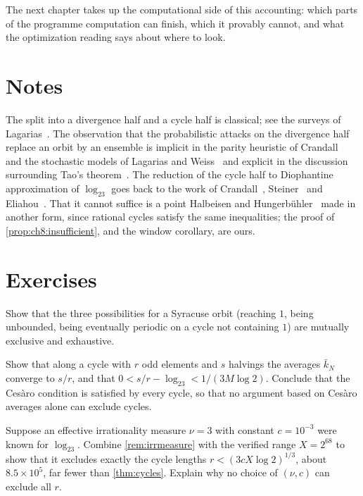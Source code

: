 The next chapter takes up the computational side of this accounting: which
parts of the programme computation can finish, which it provably cannot, and
what the optimization reading says about where to look.

\section*{Notes}

The split into a divergence half and a cycle half is classical; see the surveys
of Lagarias~\cite{lagarias1985,lagarias2010overview}. The observation that the probabilistic attacks
on the divergence half replace an orbit by an ensemble is implicit in the
parity heuristic of Crandall~\cite{crandall1978} and the stochastic models of Lagarias and Weiss~\cite{lagarias1992} and explicit in the
discussion surrounding Tao's theorem~\cite{tao2022}. The reduction of the cycle
half to Diophantine approximation of $\log_23$ goes back to the work of
Crandall~\cite{crandall1978}, Steiner~\cite{steiner1977} and Eliahou~\cite{eliahou1993}. That it
cannot suffice is a point Halbeisen and Hungerb\"uhler~\cite[\S5]{halbeisen1997}
made in another form, since rational cycles satisfy the same inequalities; the
proof of \cref{prop:ch8:insufficient}, and the window corollary, are ours.

\section*{Exercises}

\begin{exercise}
Show that the three possibilities for a Syracuse orbit (reaching $1$, being
unbounded, being eventually periodic on a cycle not containing $1$) are
mutually exclusive and exhaustive.
\end{exercise}

\begin{exercise}
Show that along a cycle with $r$ odd elements and $s$ halvings the averages
$\bar k_N$ converge to $s/r$, and that $0<s/r-\log_23<1/(3M\log2)$. Conclude that
the Ces\`aro condition is satisfied by every cycle, so that no argument based on
Ces\`aro averages alone can exclude cycles.
\end{exercise}

\begin{exercise}
Suppose an effective irrationality measure $\nu=3$ with constant $c=10^{-3}$
were known for $\log_23$. Combine \cref{rem:irrmeasure} with the verified range
$X=2^{68}$ to show that it excludes exactly the cycle lengths
$r<(3cX\log2)^{1/3}$, about $8.5\times10^{5}$, far fewer than
\cref{thm:cycles}. Explain why no choice of $(\nu,c)$ can exclude all $r$.
\end{exercise}

